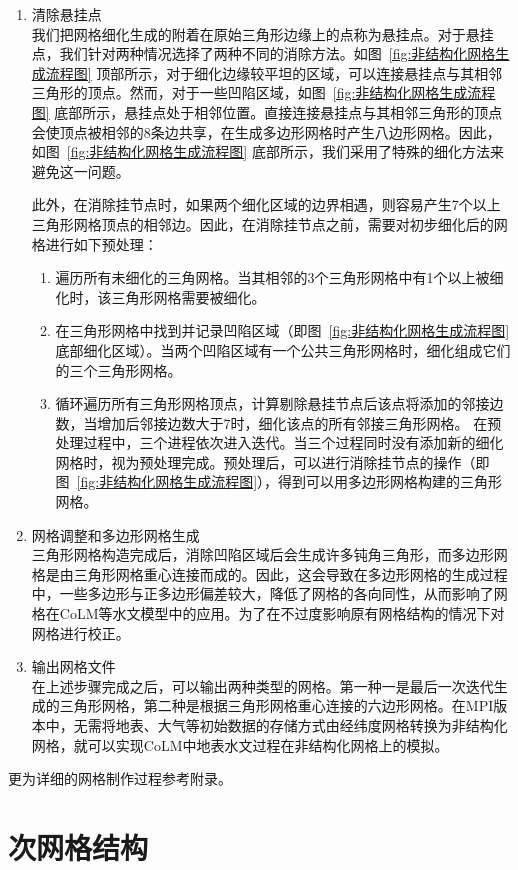 \begin{enumerate}
\item 清除悬挂点\\
我们把网格细化生成的附着在原始三角形边缘上的点称为悬挂点。对于悬挂点，我们针对两种情况选择了两种不同的消除方法。如图~\ref{fig:非结构化网格生成流程图} 顶部所示，对于细化边缘较平坦的区域，可以连接悬挂点与其相邻三角形的顶点。然而，对于一些凹陷区域，如图~\ref{fig:非结构化网格生成流程图} 底部所示，悬挂点处于相邻位置。直接连接悬挂点与其相邻三角形的顶点会使顶点被相邻的8条边共享，在生成多边形网格时产生八边形网格。因此，如图~\ref{fig:非结构化网格生成流程图} 底部所示，我们采用了特殊的细化方法来避免这一问题。

此外，在消除挂节点时，如果两个细化区域的边界相遇，则容易产生7个以上三角形网格顶点的相邻边。因此，在消除挂节点之前，需要对初步细化后的网格进行如下预处理：
\begin{enumerate}
\item 遍历所有未细化的三角网格。当其相邻的3个三角形网格中有1个以上被细化时，该三角形网格需要被细化。
\item 在三角形网格中找到并记录凹陷区域（即图~\ref{fig:非结构化网格生成流程图} 底部细化区域）。当两个凹陷区域有一个公共三角形网格时，细化组成它们的三个三角形网格。
\item 循环遍历所有三角形网格顶点，计算剔除悬挂节点后该点将添加的邻接边数，当增加后邻接边数大于7时，细化该点的所有邻接三角形网格。
在预处理过程中，三个进程依次进入迭代。当三个过程同时没有添加新的细化网格时，视为预处理完成。预处理后，可以进行消除挂节点的操作（即图~\ref{fig:非结构化网格生成流程图}），得到可以用多边形网格构建的三角形网格。
\end{enumerate}
\item 网格调整和多边形网格生成\\
三角形网格构造完成后，消除凹陷区域后会生成许多钝角三角形，而多边形网格是由三角形网格重心连接而成的。因此，这会导致在多边形网格的生成过程中，一些多边形与正多边形偏差较大，降低了网格的各向同性，从而影响了网格在CoLM等水文模型中的应用。为了在不过度影响原有网格结构的情况下对网格进行校正。
\item 输出网格文件\\
在上述步骤完成之后，可以输出两种类型的网格。第一种一是最后一次迭代生成的三角形网格，第二种是根据三角形网格重心连接的六边形网格。在MPI版本中，无需将地表、大气等初始数据的存储方式由经纬度网格转换为非结构化网格，就可以实现CoLM中地表水文过程在非结构化网格上的模拟。
\end{enumerate}

更为详细的网格制作过程参考附录。


\section{次网格结构}\label{次网格}

